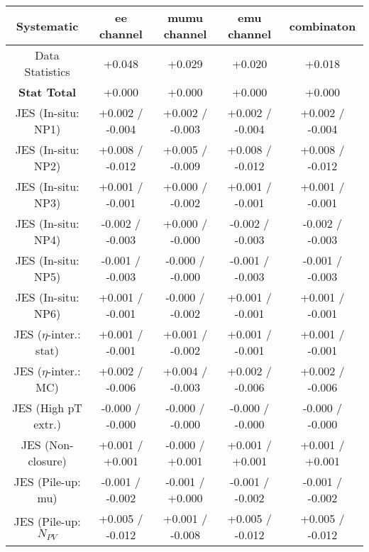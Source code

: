 \begin{table}[htbp]
\scriptsize
  \begin{center} 
  \begin{tabular}{|c|c|c|c|c|}
  \hline
Systematic                            &  ee channel&  mumu channel&  emu channel&  combinaton\\
  \hline
Data Statistics                       &+0.048              & +0.029              & +0.020              & +0.018             \\
\hline
\textbf{Stat Total}                   &+0.000              & +0.000              & +0.000              & +0.000             \\
\hline
JES (In-situ: NP1)                    &+0.002   / -0.004   & +0.002   / -0.003   & +0.002   / -0.004   & +0.002   / -0.004  \\
JES (In-situ: NP2)                    &+0.008   / -0.012   & +0.005   / -0.009   & +0.008   / -0.012   & +0.008   / -0.012  \\
JES (In-situ: NP3)                    &+0.001   / -0.001   & +0.000   / -0.002   & +0.001   / -0.001   & +0.001   / -0.001  \\
JES (In-situ: NP4)                    &-0.002   / -0.003   & +0.000   / -0.000   & -0.002   / -0.003   & -0.002   / -0.003  \\
JES (In-situ: NP5)                    &-0.001   / -0.003   & -0.000   / -0.000   & -0.001   / -0.003   & -0.001   / -0.003  \\
JES (In-situ: NP6)                    &+0.001   / -0.001   & -0.000   / -0.002   & +0.001   / -0.001   & +0.001   / -0.001  \\
JES ($\eta$-inter.: stat)               &+0.001   / -0.001   & +0.001   / -0.002   & +0.001   / -0.001   & +0.001   / -0.001  \\
JES ($\eta$-inter.: MC)                 &+0.002   / -0.006   & +0.004   / -0.003   & +0.002   / -0.006   & +0.002   / -0.006  \\
JES (High pT extr.)                  &-0.000   / -0.000   & -0.000   / -0.000   & -0.000   / -0.000   & -0.000   / -0.000  \\
JES (Non-closure)                     &+0.001   / +0.001   & -0.000   / +0.001   & +0.001   / +0.001   & +0.001   / +0.001  \\
JES (Pile-up: mu)                     &-0.001   / -0.002   & -0.001   / +0.000   & -0.001   / -0.002   & -0.001   / -0.002  \\
JES (Pile-up: $N_{PV}$                  &+0.005   / -0.012   & +0.001   / -0.008   & +0.005   / -0.012   & +0.005   / -0.012  \\

\end{tabular}
\end{center}
\end{table}
